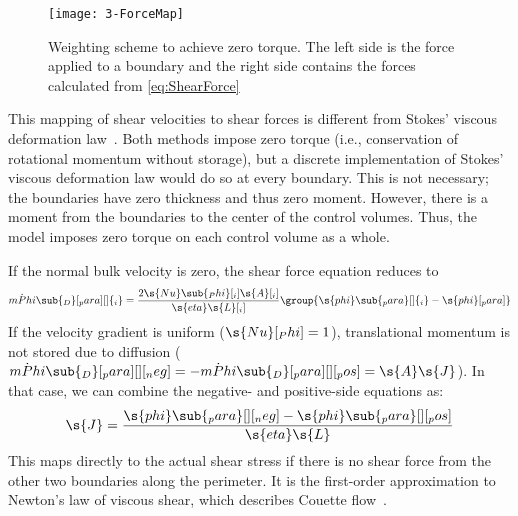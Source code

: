 \begin{figure}[htbp]
  \texttt{[image: 3-ForceMap]}%
  \caption[Weighting scheme to achieve zero torque]{Weighting scheme to achieve zero torque.  The left side is the force applied to a boundary and the right side contains the forces calculated from \autoref{eq:ShearForce}}%
  \label{fig:ForceMap}
\end{figure}

This mapping of shear velocities to shear forces is different from Stokes' viscous deformation law~\cite{Majumdar2005}\label{mark:Deformation}.  Both methods impose zero torque (i.e., conservation of rotational momentum without storage), but a discrete implementation of Stokes' viscous deformation law would do so at every boundary.  This is not necessary; the boundaries have zero thickness and thus zero moment.  However, there is a moment from the boundaries to the center of the control volumes.  Thus, the model imposes zero torque on each control volume as a whole.

If the normal bulk velocity is zero, the shear force equation reduces to
\begin{equation}
  \dot{mPhi}\sub{_D}[_para][ ]{_i} = \frac{2\s{Nu}\sub{_Phi}[_i]\s{A}[_i]}{\s{eta}\s{L}[_i]}\group{\s{phi}\sub{_para}[ ]{_i} - \s{phi}[_para]}
\end{equation}
If the velocity gradient is uniform ($\s{Nu}[_Phi] = 1$), translational momentum is not stored due to diffusion ($\dot{mPhi}\sub{_D}[_para][ ][_neg] = -\dot{mPhi}\sub{_D}[_para][ ][_pos] = \s{A}\s{J}$).  In that case, we can combine the negative- and positive-side equations as\label{mark:Couette}:
\begin{equation}
  \s{J} = \frac{\s{phi}\sub{_para}[ ][_neg] - \s{phi}\sub{_para}[ ][_pos]}{\s{eta}\s{L}}
\end{equation}
This maps directly to the actual shear stress if there is no shear force from the other two boundaries along the perimeter.  It is the first-order approximation to Newton's law of viscous shear, which describes Couette flow~\cite{Lienhard2006}. %

